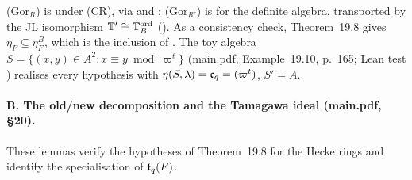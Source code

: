 \begin{outline}
(Gor$_R$) is \cite[\S3.3, p.~17--18]{Hs} \stcited{} under (CR), via \cite[Cor.~2, p.~482]{Wi95} and \cite[\S9 Prop.~2]{MW86}; (Gor$_{R'}$) is
\cite[Thm~4.5 and proof, p.~34]{Hs} \stcited{} for the definite algebra, transported by the JL isomorphism $\mathbb{T}'\cong\mathbb{T}^{\mathrm{ord}}_B$
(\cite[Rem.~7.8, p.~71]{Hs}). As a consistency check, Theorem~19.8 gives $\eta_F\subseteq\eta^B_F$, which is the inclusion of
\cite[Rem.~7.8]{Hs}. The toy algebra $S=\{(x,y)\in A^2:x\equiv y\bmod\varpi^t\}$ (main.pdf, Example~19.10, p.~165; Lean test
) realises every hypothesis with $\eta(S,\lambda)=\mathfrak{c}_q=(\varpi^t)$, $S'=A$.
\end{outline}

\paragraph{B. The old/new decomposition and the Tamagawa ideal (main.pdf, \S20).} These lemmas verify the hypotheses of
Theorem~19.8 for the Hecke rings and identify the specialisation of $\mathfrak{t}_q(F)$.

